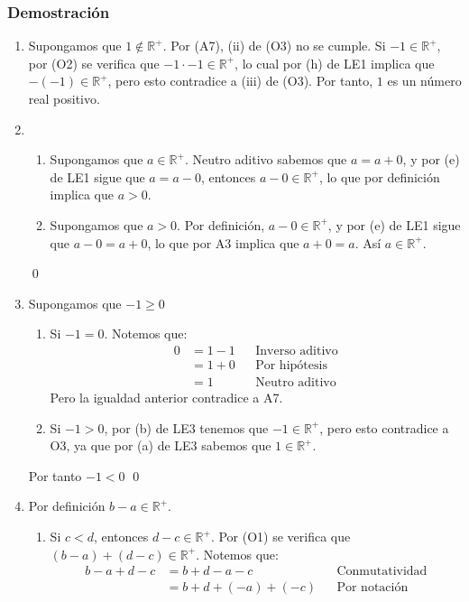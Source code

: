 \documentclass[11pt]{article}
\newcommand{\R}{\mathbb{R}}
\begin{document}
\subsubsection*{Demostración}
%
\begin{enumerate}[label=\alph*)]
\item Supongamos que $1 \notin \R^+$. Por (A7), (ii) de (O3) no se cumple. Si $-1 \in \R^+$, por (O2) se verifica que $-1 \cdot -1 \in \R^+$, lo cual por (h) de LE1 implica que $-(-1) \in \R^+$, pero esto contradice a (iii) de (O3). Por tanto, $1$ es un número real positivo.
\item \begin{enumerate}[label=\roman*)]
    \item Supongamos que $a \in \R^+$. Neutro aditivo sabemos que $a=a+0$, y por (e) de LE1 sigue que $a=a-0$, entonces $a-0 \in \R^+$, lo que por definición implica que $a>0$.
    \item Supongamos que $a>0$. Por definición, $a-0 \in \R^+$, y por (e) de LE1 sigue que $a-0=a+0$, lo que por A3 implica que $a+0=a$. Así $a \in \R^+$.
\end{enumerate}\qed
\pagebreak
\item Supongamos que $-1 \geq 0$
    \begin{enumerate}[label=\roman*)]
    \item Si $-1=0$. Notemos que:
        \begin{align*}
        0 &= 1 - 1 && \text{Inverso aditivo}\\
        &= 1 + 0 && \text{Por hipótesis}\\
        &= 1 && \text{Neutro aditivo}
        \end{align*}
    Pero la igualdad anterior contradice a A7.
    \item Si $-1 > 0$, por (b) de LE3 tenemos que $-1 \in \R^+$, pero esto contradice a O3, ya que por (a) de LE3 sabemos que $1 \in \R^+$.
    \end{enumerate} Por tanto $-1<0$ \qed
\item Por definición $b-a \in \R^+$.
    \begin{enumerate}[label=\roman*)]
    \item Si $c<d$, entonces $d-c \in \R^+$. Por (O1) se verifica que $(b-a)+(d-c) \in \R^+$. Notemos que:
        \begin{align*}
        b-a+d-c &= b+d-a-c && \text{Conmutatividad}\\
        &= b+d+(-a)+(-c) && \text{Por notación}\\

\end{align*}
\end{enumerate}
\end{enumerate}
\end{document}
